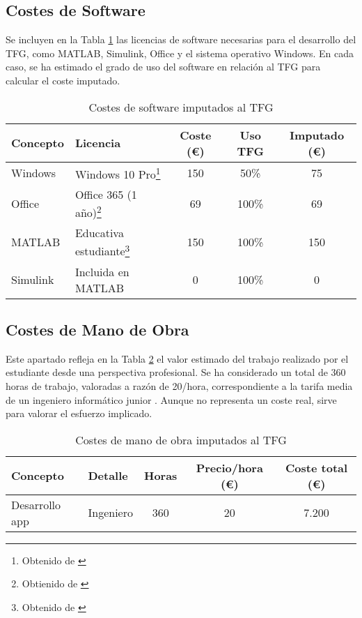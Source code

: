 \subsection{Costes de Software}
Se incluyen en la Tabla \ref{software} las licencias de software necesarias para el desarrollo del TFG, como MATLAB, Simulink, Office y el sistema operativo Windows. En cada caso, se ha estimado el grado de uso del software en relación al TFG para calcular el coste imputado.
\begin{table}[H]
\centering
\small
\begin{tabular}{|l|l|c|c|c|}
\hline
\textbf{Concepto} & \textbf{Licencia} & \textbf{Coste (€)} & \textbf{Uso TFG} & \textbf{Imputado (€)} \\
\hline
Windows & Windows 10 Pro\footnote{Obtenido de \cite{microsoft365personal}} & 150 & 50\% & 75 \\
Office & Office 365 (1 año)\footnote{Obtienido de \cite{microsoft_windows11_get}} & 69 & 100\% & 69 \\
MATLAB & Educativa estudiante\footnote{Obtenido de \cite{mathworks_matlab_student}} & 150 & 100\% & 150 \\
Simulink & Incluida en MATLAB & 0 & 100\% & 0 \\
\hline
\end{tabular}
\caption{Costes de software imputados al TFG}
\label{software}
\end{table}

\subsection{Costes de Mano de Obra}
Este apartado refleja en la Tabla \ref{mano obra} el valor estimado del trabajo realizado por el estudiante desde una perspectiva profesional. Se ha considerado un total de 360 horas de trabajo, valoradas a razón de 20\€/hora, correspondiente a la tarifa media de un ingeniero informático junior \cite{glassdoor_junior_ing_inf}. Aunque no representa un coste real, sirve para valorar el esfuerzo implicado.
\begin{table}[H]
\centering
\begin{tabular}{|l|p{5cm}|c|c|c|}
\hline
\textbf{Concepto} & \textbf{Detalle} & \textbf{Horas} & \textbf{Precio/hora (€)} & \textbf{Coste total (€)} \\
\hline
Desarrollo app & Ingeniero & 360 & 20 & 7.200 \\
\hline
\end{tabular}
\caption{Costes de mano de obra imputados al TFG}
\label{mano obra}
\end{table}

